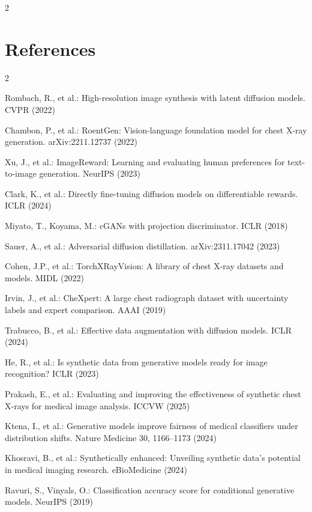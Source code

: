 \documentclass[a0,portrait]{a0poster}
\begin{document}
\begin{minipage}[c]{\linewidth}
\begin{framed}
\begin{multicols}{2}
\section*{References}
{\scriptsize\setlength{\columnseprule}{0pt}\setlength{\columnsep}{40pt}
\begin{multicols}{2}
\begin{enumerate}[label={[\arabic*]}, leftmargin=*, itemsep=0pt, topsep=0pt]
\item Rombach, R., et al.: High-resolution image synthesis with latent diffusion models. CVPR (2022)
\item Chambon, P., et al.: RoentGen: Vision-language foundation model for chest X-ray generation. arXiv:2211.12737 (2022)
\item Xu, J., et al.: ImageReward: Learning and evaluating human preferences for text-to-image generation. NeurIPS (2023)
\item Clark, K., et al.: Directly fine-tuning diffusion models on differentiable rewards. ICLR (2024)
\item Miyato, T., Koyama, M.: cGANs with projection discriminator. ICLR (2018)
\item Sauer, A., et al.: Adversarial diffusion distillation. arXiv:2311.17042 (2023)
\item Cohen, J.P., et al.: TorchXRayVision: A library of chest X-ray datasets and models. MIDL (2022)
\item Irvin, J., et al.: CheXpert: A large chest radiograph dataset with uncertainty labels and expert comparison. AAAI (2019)
\item Trabucco, B., et al.: Effective data augmentation with diffusion models. ICLR (2024)
\item He, R., et al.: Is synthetic data from generative models ready for image recognition? ICLR (2023)
\item Prakash, E., et al.: Evaluating and improving the effectiveness of synthetic chest X-rays for medical image analysis. ICCVW (2025)
\item Ktena, I., et al.: Generative models improve fairness of medical classifiers under distribution shifts. Nature Medicine 30, 1166--1173 (2024)
\item Khosravi, B., et al.: Synthetically enhanced: Unveiling synthetic data's potential in medical imaging research. eBioMedicine (2024)
\item Ravuri, S., Vinyals, O.: Classification accuracy score for conditional generative models. NeurIPS (2019)
\end{enumerate}
\end{multicols}}


\end{multicols}
\end{framed}
\end{minipage}
\end{document}
